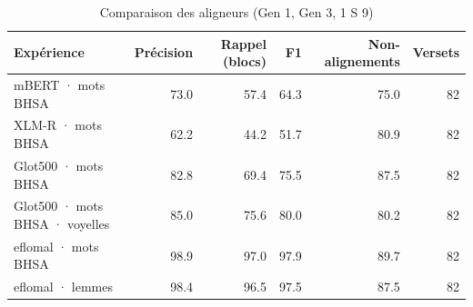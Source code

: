 \begin{table}[ht]
\centering
\caption{Comparaison des aligneurs (Gen 1, Gen 3, 1 S 9)}
\label{tab:comparaison_des_aligneurs_gen_1_gen_3_1_s_9}
\begin{tabular}{lrrrrr}
\toprule
Expérience & Précision & Rappel (blocs) & F1 & Non-alignements & Versets \\
\midrule
mBERT · mots BHSA & 73.0 & 57.4 & 64.3 & 75.0 & 82 \\
XLM-R · mots BHSA & 62.2 & 44.2 & 51.7 & 80.9 & 82 \\
Glot500 · mots BHSA & 82.8 & 69.4 & 75.5 & 87.5 & 82 \\
Glot500 · mots BHSA · voyelles & 85.0 & 75.6 & 80.0 & 80.2 & 82 \\
eflomal · mots BHSA & 98.9 & 97.0 & 97.9 & 89.7 & 82 \\
eflomal · lemmes & 98.4 & 96.5 & 97.5 & 87.5 & 82 \\
\bottomrule
\end{tabular}
\end{table}
